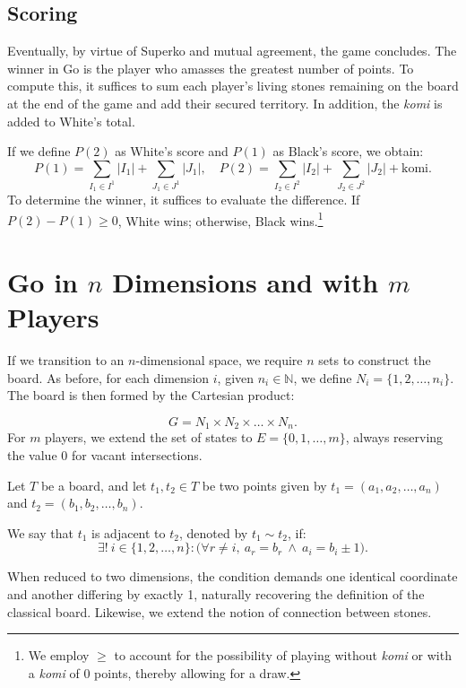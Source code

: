 \subsection{Scoring}\label{contarpuntos}
Eventually, by virtue of Superko and mutual agreement, the game concludes. The winner in Go is the player who amasses the greatest number of points. To compute this, it suffices to sum each player's living stones remaining on the board at the end of the game and add their secured territory. In addition, the \textit{komi} is added to White's total.


If we define \(P(2)\) as White's score and \(P(1)\) as Black's score, we obtain:
$$P(1) = \sum_{I_1 \in I^{1}} |I_{1}| + \sum_{J_1 \in J^{1}} |J_{1}|, \quad P(2) = \sum_{I_2 \in I^{2}} |I_2| + \sum_{J_2 \in J^{2}} |J_{2}| + \text{komi}.$$
To determine the winner, it suffices to evaluate the difference. If $P(2) - P(1) \geq 0$, White wins; otherwise, Black wins.\footnote{We employ $\geq$ to account for the possibility of playing without \textit{komi} or with a \textit{komi} of $0$ points, thereby allowing for a draw.}

\section{Go in \texorpdfstring{$n$}{n} Dimensions and with \texorpdfstring{$m$}{m} Players}\label{Go_n_m}

If we transition to an $n$-dimensional space, we require $n$ sets to construct the board. As before, for each dimension $i$, given $n_i \in \mathbb{N}$, we define $N_i = \{1, 2, \dots, n_i\}$. The board is then formed by the Cartesian product:

\[ G = N_1 \times N_2 \times \dots \times N_n. \]
For $m$ players, we extend the set of states to $E = \{0, 1, \dots, m\}$, always reserving the value $0$ for vacant intersections.

\begin{definition}
	Let \(T\) be a board, and let \(t_1, t_2 \in T\) be two points given by \(t_1 = (a_1, a_2, \dots, a_n)\) and \(t_2 = (b_1, b_2, \dots, b_n)\).
	
	We say that \(t_1\) is adjacent to \(t_2\), denoted by \(t_1 \sim t_2\), if:
	$$\exists! \ i \in \{1, 2, \dots, n\} : \big( \forall r \neq i, \ a_r = b_r \ \land \ a_i = b_i \pm 1 \big).$$
\end{definition}

When reduced to two dimensions, the condition demands one identical coordinate and another differing by exactly 1, naturally recovering the definition of the classical board. Likewise, we extend the notion of connection between stones.

